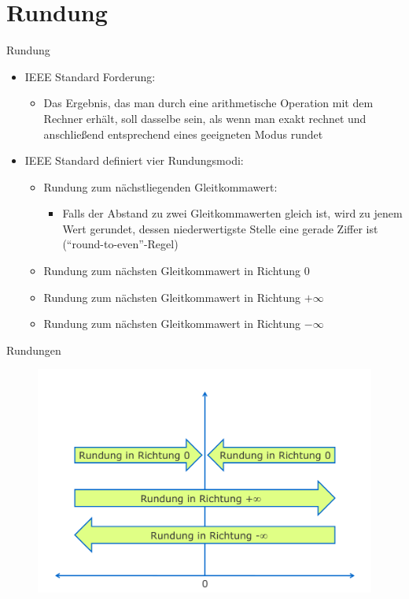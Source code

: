 \documentclass[12pt%
,xcolor=table
,aspectratio=169%
]{beamer}
\begin{document}
\section{Rundung}
\begin{frame}{Rundung}
\begin{itemize}
	\item IEEE Standard Forderung:
	\begin{itemize}
		\item Das Ergebnis, das man durch eine arithmetische Operation mit dem Rechner erhält, soll dasselbe sein, als wenn man exakt rechnet und anschließend entsprechend eines geeigneten Modus rundet
	\end{itemize}
	\item IEEE Standard definiert vier Rundungsmodi:
	\begin{itemize}
		\item Rundung zum nächstliegenden Gleitkommawert:
		\begin{itemize}
			\item Falls der Abstand zu zwei Gleitkommawerten gleich ist, wird zu jenem Wert gerundet, dessen
niederwertigste Stelle eine gerade Ziffer ist (\enquote{round-to-even}-Regel)
		\end{itemize}
		\item Rundung zum nächsten Gleitkommawert in Richtung $0$
		\item Rundung zum nächsten Gleitkommawert in Richtung $+ \infty$
		\item Rundung zum nächsten Gleitkommawert in Richtung $- \infty$
	\end{itemize}
\end{itemize}
\end{frame}

\begin{frame}{Rundungen}
\begin{figure}
\center
\includegraphics[scale=0.325]{pictures/rundung1}
\end{figure}
\end{frame}
\end{document}
